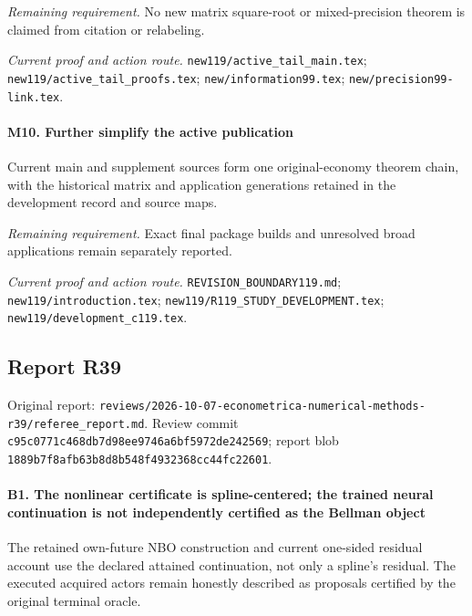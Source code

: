 \par\emph{Remaining requirement.} No new matrix square-root or mixed-precision theorem is claimed from citation or relabeling.

\par\emph{Current proof and action route.} \nolinkurl{new119/active_tail_main.tex}; \nolinkurl{new119/active_tail_proofs.tex}; \nolinkurl{new/information99.tex}; \nolinkurl{new/precision99-link.tex}.

\paragraph{M10. Further simplify the active publication}

Current main and supplement sources form one original-economy theorem chain, with the historical matrix and application generations retained in the development record and source maps.

\par\emph{Remaining requirement.} Exact final package builds and unresolved broad applications remain separately reported.

\par\emph{Current proof and action route.} \nolinkurl{REVISION_BOUNDARY119.md}; \nolinkurl{new119/introduction.tex}; \nolinkurl{new119/R119_STUDY_DEVELOPMENT.tex}; \nolinkurl{new119/development_c119.tex}.

\subsection{Report R39}

Original report: \nolinkurl{reviews/2026-10-07-econometrica-numerical-methods-r39/referee_report.md}. Review commit \nolinkurl{c95c0771c468db7d98ee9746a6bf5972de242569}; report blob \nolinkurl{1889b7f8afb63b8d8b548f4932368cc44fc22601}.

\paragraph{B1. The nonlinear certificate is spline-centered; the trained neural continuation is not independently certified as the Bellman object}

The retained own-future NBO construction and current one-sided residual account use the declared attained continuation, not only a spline's residual. The executed acquired actors remain honestly described as proposals certified by the original terminal oracle.

